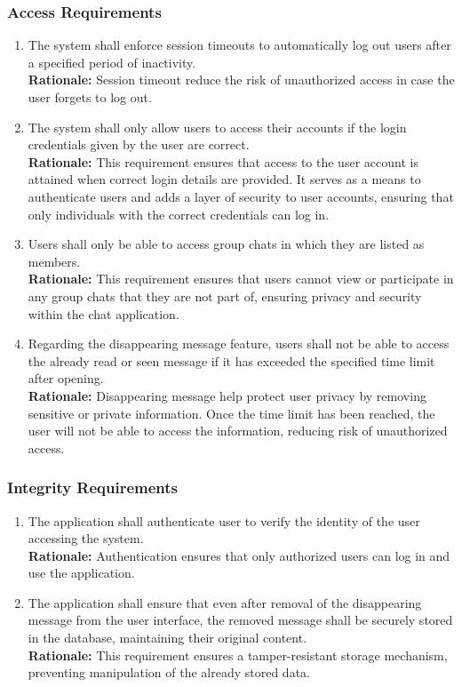\documentclass[]{article}
\begin{document}
\subsubsection{Access Requirements}
\label{ssub:access_requirements}
\begin{enumerate}[{SR-AC}1. ]
	\item The system shall enforce session timeouts to automatically log out users after a specified period of inactivity. \\
	{\bf Rationale:} Session timeout reduce the risk of unauthorized access in case the user forgets to log out.
	\item The system shall only allow users to access their accounts if the login credentials given by the user are correct. \\
	{\bf Rationale:} This requirement ensures that access to the user account is attained when correct login details are provided. 
	It serves as a means to authenticate users and adds a layer of security to user accounts, ensuring that only individuals with the 
	correct credentials can log in.
	\item Users shall only be able to access group chats in which they are listed as members. \\
	{\bf Rationale:} This requirement ensures that users cannot view or participate in any group chats that 
	they are not part of, ensuring privacy and security within the chat application.
	\item Regarding the disappearing message feature, users shall not be able to access the already read or seen message if it has exceeded the specified time limit
	after opening. \\
	{\bf Rationale:} Disappearing message help protect user privacy by removing sensitive or private information.
	Once the time limit has been reached, the user will not be able to access the information, reducing risk
	of unauthorized access.
\end{enumerate}

\subsubsection{Integrity Requirements}
\label{ssub:integrity_requirements}
\begin{enumerate}[{SR-INT}1. ]
	\item The application shall authenticate user to verify the identity of the user accessing the system. \\
	{\bf Rationale:} Authentication ensures that only authorized users can log in and use the application.
	\item The application shall ensure that even after removal of the disappearing message from the user interface,
	the removed message shall be securely stored in the database, maintaining their original content. \\
	{\bf Rationale:} This requirement ensures a tamper-resistant storage mechanism, preventing manipulation 
	of the already stored data.
\end{enumerate}
\end{document}
